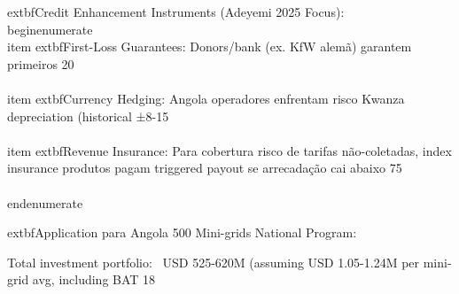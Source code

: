 \documentclass[12pt, a4paper]{article}
\begin{document}
{{{{{{{{{{{	extbf{Credit Enhancement Instruments (Adeyemi 2025 Focus)}:
\\begin{enumerate}
\\item 	extbf{First-Loss Guarantees}: Donors/bank (ex. KfW alemã) garantem primeiros 20\\%
\\item 	extbf{Currency Hedging}: Angola operadores enfrentam risco Kwanza depreciation (historical ±8-15\\%
\\item 	extbf{Revenue Insurance}: Para cobertura risco de tarifas não-coletadas, index insurance produtos pagam triggered payout se arrecadação cai abaixo 75\\%
\\end{enumerate}

	extbf{Application para Angola 500 Mini-grids National Program}:

Total investment portfolio: ~USD 525-620M (assuming USD 1.05-1.24M per mini-grid avg, including BAT 18\\%

}}}}}}}}}}}
\end{document}
